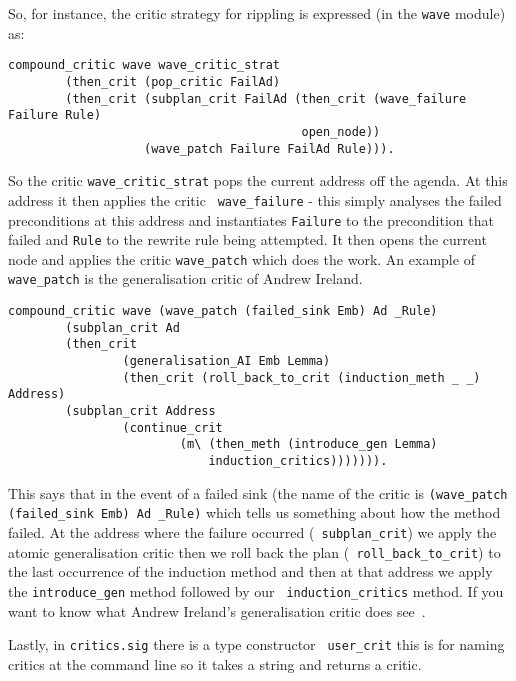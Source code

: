 \begin{example}
So,
for instance, the critic strategy for rippling is expressed (in the
{\tt wave} module) as:
\begin{verbatim}
compound_critic wave wave_critic_strat
        (then_crit (pop_critic FailAd)
        (then_crit (subplan_crit FailAd (then_crit (wave_failure Failure Rule)
                                         open_node))
                   (wave_patch Failure FailAd Rule))).
\end{verbatim}
So the critic {\tt wave\_critic\_strat}
pops the current address off the agenda.  At this
address it then applies the critic {\tt
  wave\_failure} - this simply analyses the
failed preconditions at this address and instantiates {\tt Failure} to 
the precondition that failed and {\tt Rule} to the 
rewrite rule being attempted.  It then opens the
current node and applies the critic {\tt wave\_patch} which does the
work.  An example of {\tt wave\_patch} is the
generalisation critic of Andrew Ireland.
\begin{verbatim}
compound_critic wave (wave_patch (failed_sink Emb) Ad _Rule)
        (subplan_crit Ad
        (then_crit 
                (generalisation_AI Emb Lemma) 
                (then_crit (roll_back_to_crit (induction_meth _ _) Address)
        (subplan_crit Address
                (continue_crit 
                        (m\ (then_meth (introduce_gen Lemma)
                            induction_critics))))))).
\end{verbatim}
This says that in the event of a failed sink (the
name of the critic is {\tt (wave\_patch (failed\_sink Emb) Ad \_Rule)}
which tells us something about how the method
failed.  At the address where the failure occurred ({\tt
  subplan\_crit}) we apply the atomic
generalisation critic then we roll back the plan ({\tt
  roll\_back\_to\_crit}) to the last
occurrence of the induction method and then at
that address we apply the {\tt introduce\_gen}
method followed by our {\tt
  induction\_critics} method.  If you want
to know what Andrew Ireland's generalisation critic does
see~\cite{pub716}.
\end{example}

Lastly, in {\tt critics.sig} there is a type constructor {\tt
  user\_crit} this is for naming critics at the
command line so it takes a string and returns a
critic. 

